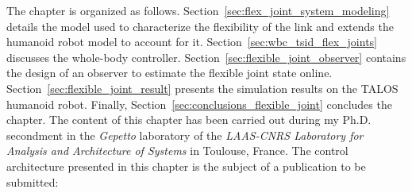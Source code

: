 \par
The chapter is organized as follows. Section~\ref{sec:flex_joint_system_modeling} details the model used to characterize the flexibility of the link and extends the humanoid robot model to account for it. Section~\ref{sec:wbc_tsid_flex_joints} discusses the whole-body controller. Section~\ref{sec:flexible_joint_observer} contains the design of an observer to estimate the flexible joint state online. Section~\ref{sec:flexible_joint_result} presents the simulation results on the TALOS humanoid robot. Finally, Section~\ref{sec:conclusions_flexible_joint} concludes the chapter.
The content of this chapter has been carried out during my Ph.D. secondment in the \emph{Gepetto} laboratory of the \emph{LAAS-CNRS Laboratory for Analysis and Architecture of Systems} in Toulouse, France.
The control architecture presented in this chapter is the subject of a publication to be submitted:






